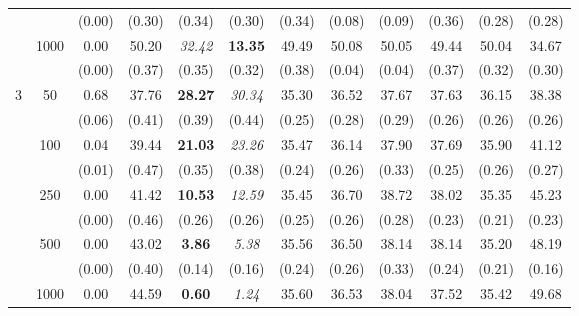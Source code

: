 \documentclass[twoside]{article}
\newcommand{\0}{\mathbf{0}}
\newcommand{\1}{\mathbf{1}}
\numberwithin{equation}{section}
\begin{document}
\begin{table}[t]
\begin{tabular}{|c|c|c|c|c|c|c|c|c|c|c|c|}
    &  & (0.00)    & (0.30)                    & (0.34)                   & (0.30)                    & (0.34) & (0.08) & (0.09) & (0.36) & (0.28) & (0.28) \\ \cline{2-12}
    & \multirow{2}{*}{1000} & 0.00      & 50.20                     & {\it 32.42}                    & {\bf 13.35}                    & 49.49  & 50.08  & 50.05  & 49.44  & 50.04  & 34.67  \\
    &  & (0.00)    & (0.37)                   & (0.35)                   & (0.32)                   & (0.38) & (0.04) & (0.04) & (0.37) & (0.32) & (0.30)  \\ \hline
\multirow{10}{*}{3}    & \multirow{2}{*}{50}   & 0.68   & 37.76                    & {\bf 28.27}                    & {\it 30.34}                    & 35.30   & 36.52  & 37.67  & 37.63  & 36.15  & 38.38  \\
    &  & (0.06) & (0.41)                   & (0.39)                   & (0.44)                   & (0.25) & (0.28) & (0.29) & (0.26) & (0.26) & (0.26) \\ \cline{2-12}
    & \multirow{2}{*}{100}  & 0.04   & 39.44                    & {\bf 21.03}                    & {\it 23.26}                    & 35.47  & 36.14  & 37.90   & 37.69  & 35.90   & 41.12  \\
    &  & (0.01) & (0.47)                   & (0.35)                   & (0.38)                   & (0.24) & (0.26) & (0.33) & (0.25) & (0.26) & (0.27) \\ \cline{2-12}
    & \multirow{2}{*}{250}  & 0.00      & 41.42                    & {\bf 10.53}                    & {\it 12.59}                    & 35.45  & 36.70   & 38.72  & 38.02  & 35.35  & 45.23  \\
    &  & (0.00)    & (0.46)                   & (0.26)                   & (0.26)                   & (0.25) & (0.26) & (0.28) & (0.23) & (0.21) & (0.23) \\ \cline{2-12}
    & \multirow{2}{*}{500}  & 0.00      & 43.02                    & {\bf 3.86}                     & {\it 5.38}                     & 35.56  & 36.50   & 38.14  & 38.14  & 35.20   & 48.19  \\
    &  & (0.00)    & (0.40)                    & (0.14)                   & (0.16)                   & (0.24) & (0.26) & (0.33) & (0.24) & (0.21) & (0.16) \\ \cline{2-12}
    & \multirow{2}{*}{1000} & 0.00      & 44.59                    & {\bf 0.60}                      & {\it 1.24}                     & 35.60   & 36.53  & 38.04  & 37.52  & 35.42  & 49.68  \\

\end{tabular}
\end{table}
\end{document}
